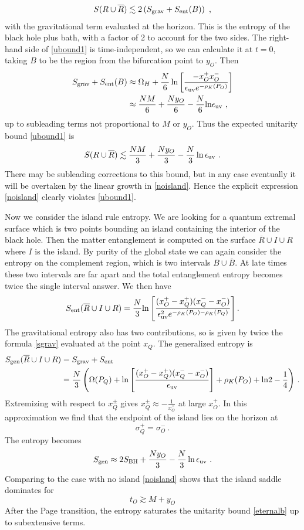 \documentclass[12pt,oneside,letterpaper]{article}
\newcommand{\f}{\frac}
\newcommand{\be}{\begin{equation}}
\newcommand{\ee}{\end{equation}}
\def\be{\begin{eqnarray}}
\def\ee{\end{eqnarray}}
\let\f=\frac
\def\be{\begin{equation}}
\def\ee{\end{equation}}
\def\m{{M}}
\def\euv{\epsilon_{\rm uv}}
\def\log{{\rm ln}}
\numberwithin{equation}{section}
\def \be {\begin{equation}}
\def \ee {\end{equation}}
\begin{document}
\be\label{ubound1}
S(R \cup \overline{R}) \lesssim 2\left( S_{\rm grav} + S_{\rm ent}(B)  \right) \ ,
\ee
with the gravitational term evaluated at the horizon. This is the entropy of the black hole plus bath, with a factor of 2  to account for the two sides. The right-hand side of \eqref{ubound1} is time-independent, so we can calculate it at $t=0$, taking $B$ to be the region from the bifurcation point to $y_O$. Then
\begin{align}
S_{\rm grav} + S_{\rm ent}(B) &\approx
 \Omega_H + \frac{N}{6}\ln \left[ \frac{-x_O^+ x_O^-}{\epsilon_{\rm uv}e^{-\rho_K(P_O)}}\right]\\
&\approx \frac{NM}{6}  + \frac{N y_O}{6} - \frac{N}{6}\log \epsilon_{\rm uv} \ ,
\end{align}
up to subleading terms not proportional to $M$ or $y_O$. Thus the expected unitarity bound \eqref{ubound1} is
\be\label{eternalb}
S(R \cup \overline{R}) \lesssim \frac{NM}{3} + \frac{Ny_O}{3} - \frac{N}{3} \ln \epsilon_{\rm uv} \ .
\ee
There may be subleading corrections to this bound, but in any case eventually it will be overtaken by the linear growth in \eqref{noisland}.  Hence the explicit expression \eqref{noisland} clearly violates \eqref{ubound1}.


Now we consider the island rule entropy. We are looking for a quantum extremal surface which is two points bounding an island containing the interior of the black hole. Then the matter entanglement is computed on the surface $\overline{R} \cup I\cup R$ where $I$ is the island. By purity of the global state we can again consider the entropy on the complement region, which is two intervals $B \cup \overline{B}$. At late times these two intervals are far apart and the total  entanglement entropy becomes twice the single interval answer.  We then have
\be
S_{\text{ent}}({\overline{R}\cup I \cup R}) = \f{N}{3}\log \left[\f{(x_O^+-x_Q^+)(x_Q^--x_O^-)}{\euv ^2 e^{-\rho_K(P_O)-\rho_K(P_Q)}}\right].
\ee
The gravitational entropy also has two contributions, so is given by twice the formula \eqref{sgrav} evaluated at the point $x_Q$.
The generalized entropy is 
\begin{align}
S_{\text{gen}}(\overline{R}\cup I\cup R) &= S_{\text{grav}} + S_{\text{ent}}   \\
&=\f N 3 \left(\Omega(P_Q)+\log \left[\f{(x_O^+-x_Q^+)(x_Q^--x_O^-)}{\epsilon_{\rm uv}}\right] + \rho_K(P_O) + \log 2 - \f 1 4\right)\, . \notag
\end{align}
Extremizing with respect to $x_Q^\pm$ gives 
$x_Q^\pm \approx -\f{1}{ x_O^\mp}$ at large $x_O^+$. In this approximation we find that the endpoint of the island lies on the horizon at
\be
\sigma_Q^+ = \sigma_O^- \ .
\ee
The entropy becomes 
\begin{align}\label{seternali}
S_{\text{gen}} \approx 2S_{\rm BH} + \frac{Ny_O}{3} - \frac{N}{3} \ln \epsilon_{\rm uv} \ .
\end{align}
Comparing to the case with no island \eqref{noisland} shows that the island saddle dominates for 
\be
t_O \gtrsim  {\m}{}  +y_O
\ee
After the Page transition, the entropy saturates the unitarity bound \eqref{eternalb} up to subextensive terms. 
\end{document}
